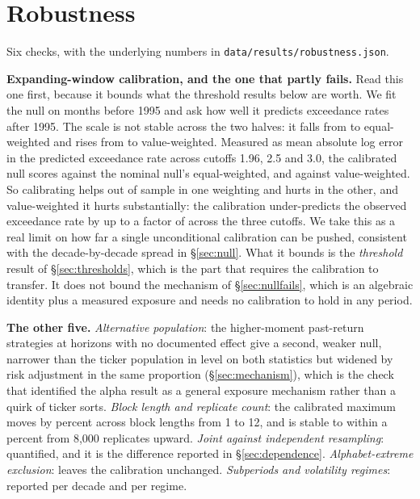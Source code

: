 \documentclass{article}
\begin{document}
\section{Robustness}
\label{sec:robust}



Six checks, with the underlying numbers in
\texttt{data/results/robustness.json}.

\textbf{Expanding-window calibration, and the one that partly fails.} Read this
one first, because it bounds what the threshold results below are worth. We fit the
null on months before 1995 and ask how well it predicts exceedance rates after
1995. The scale is not stable across the two halves: it falls from
\bzooexpWindowSdEarlyEw{} to \bzooexpWindowSdLateEw{} equal-weighted and rises
from \bzooexpWindowSdEarlyVw{} to \bzooexpWindowSdLateVw{} value-weighted.
Measured as mean absolute log error in the predicted exceedance rate across
cutoffs 1.96, 2.5 and 3.0, the calibrated null scores
\bzooexpWindowErrCalEw{} against the nominal null's \bzooexpWindowErrNomEw{}
equal-weighted, and \bzooexpWindowErrCalVw{} against \bzooexpWindowErrNomVw{}
value-weighted. So calibrating helps out of sample in one weighting and hurts in
the other, and value-weighted it hurts substantially: the calibration
under-predicts the observed exceedance rate by up to a factor of
\bzooexpWindowWorstRatioVw{} across the three cutoffs. We take this as a real limit on how far a single unconditional
calibration can be pushed, consistent with the decade-by-decade spread in
\S\ref{sec:null}. What it bounds is the \emph{threshold} result of
\S\ref{sec:thresholds}, which is the part that requires the calibration to
transfer. It does not bound the mechanism of \S\ref{sec:nullfails}, which is an
algebraic identity plus a measured exposure and needs no calibration to hold in
any period.

\textbf{The other five.} \emph{Alternative population}: the \bzooamAltN{}
higher-moment past-return strategies at horizons with no documented effect give
a second, weaker null, narrower than the ticker population in level on both
statistics but widened by risk adjustment in the same proportion
(\S\ref{sec:mechanism}), which is the check that identified the alpha result as
a general exposure mechanism rather than a quirk of ticker sorts.
\emph{Block length and replicate count}: the calibrated maximum moves by
\bzoobootBlockSpreadPct{} percent across block lengths from 1 to 12, and is
stable to within a percent from 8{,}000 replicates upward.
\emph{Joint against independent resampling}: quantified, and it is the
difference reported in \S\ref{sec:dependence}.
\emph{Alphabet-extreme exclusion}: leaves the calibration unchanged.
\emph{Subperiods and volatility regimes}: reported per decade and per regime.
\end{document}
